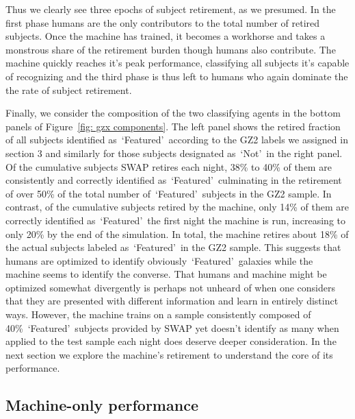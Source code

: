 \documentclass[twocolumn]{aastex6}
\newcommand{\feat}{`Featured'}
\newcommand{\notfeat}{`Not'}
\begin{document}
Thus we clearly see  three epochs of subject retirement, as we presumed.
In the first phase humans are the only contributors to the total number of retired subjects.  
Once the machine has trained, it becomes a workhorse and takes a monstrous share 
of the retirement burden though humans also contribute. 
The machine quickly reaches it's peak performance, classifying all subjects 
it's capable of recognizing and the third phase is thus left to humans who again dominate 
the the rate of subject retirement. 

Finally, we consider the composition of the two classifying agents in the bottom 
panels of Figure~\ref{fig: gzx components}. The left panel shows the retired fraction of 
all subjects identified as~\feat~according to the GZ2 labels we assigned in section 3 and 
similarly for those subjects designated as~\notfeat~in the right panel. 
Of the cumulative subjects SWAP retires each night, 38\% to 40\% of them are 
consistently and correctly identified as~\feat~culminating in the retirement of 
over 50\% of the total number of~\feat~subjects in the GZ2 sample. In contrast, 
of the cumulative subjects retired by the machine, only 14\% of them are correctly 
identified as~\feat~the first night the machine is run, increasing to only 20\% by 
the end of the simulation. In total, the machine retires about 18\% of the actual 
subjects labeled as~\feat~in the GZ2 sample. 
This suggests that humans are optimized  to identify obviously~\feat~galaxies 
while the machine seems to identify the converse.
That humans and machine might be optimized  somewhat divergently is perhaps not 
unheard of when one considers that they are presented with different information 
and learn in entirely distinct ways. However,  the machine trains on a sample consistently
composed of 40\%~\feat~subjects provided by SWAP yet doesn't identify as many when 
applied to the test sample each night does deserve deeper consideration. 
In the next section we explore the machine's retirement to understand the core of its performance.


\subsection{Machine-only performance}\label{sec: machine performance}
\end{document}
